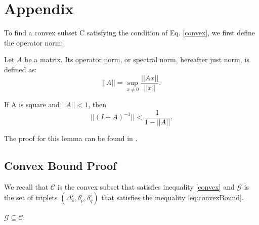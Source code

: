 \nocite{*}

\appendix
\section{Appendix} \label{AppendixA}
To find a convex subset C satisfying the condition of Eq. \ref{convex},
we first define the operator norm:
\begin{definition}
Let $A$ be a matrix. Its operator norm, or
spectral norm, hereafter just norm, is defined as:
\begin{equation}
||A|| = \sup_{x \neq 0}\frac{||Ax||}{||x||}.
\end{equation}
\end{definition}

\begin{lemma} \label{lemma:newman}
If A is square and $||A|| < 1$, then
\begin{equation*}
||(I+A)^{-1}|| < \frac{1}{1-||A||}.
\end{equation*}
\end{lemma}
The proof for this lemma can be found in \cite{gabel2015monitoring}.

\subsection{Convex Bound Proof}
We recall that $\mathcal{C}$ is the convex subset that satisfies
inequality \ref{convex} and $\mathcal{G}$ is the set of triplets
$(\Delta_s^i, \delta_p^i, \delta_q^i)$
 that satisfies the inequality \ref{eq:convexBound}.

\begin{lemma}
$\mathcal{G} \subseteq \mathcal{C}$:
\end{lemma}

